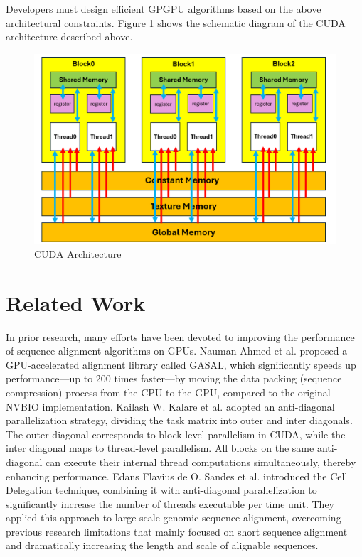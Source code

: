 \documentclass[PhD]{PHlab-thesis}
\begin{document}
Developers must design efficient GPGPU algorithms based on the above architectural constraints. Figure \ref{fig:CUDA Architecture} shows the schematic diagram of the CUDA architecture described above.
\begin{figure}[ht]
    \centering
    \includegraphics[width = 1\textwidth]{figures/CUDA_Architecture.png}
    \caption{CUDA Architecture}
    \label{fig:CUDA Architecture}
\end{figure}

\chapter{Related Work}
In prior research, many efforts have been devoted to improving the performance of sequence alignment algorithms on GPUs. Nauman Ahmed et al. \cite{CUDA3} proposed a GPU-accelerated alignment library called GASAL, which significantly speeds up performance—up to 200 times faster—by moving the data packing (sequence compression) process from the CPU to the GPU, compared to the original NVBIO implementation. Kailash W. Kalare et al. \cite{CUDA6} adopted an anti-diagonal parallelization strategy, dividing the task matrix into outer and inter diagonals. The outer diagonal corresponds to block-level parallelism in CUDA, while the inter diagonal maps to thread-level parallelism. All blocks on the same anti-diagonal can execute their internal thread computations simultaneously, thereby enhancing performance. Edans Flavius de O. Sandes et al. \cite{CUDAlign} introduced the Cell Delegation technique, combining it with anti-diagonal parallelization to significantly increase the number of threads executable per time unit. They applied this approach to large-scale genomic sequence alignment, overcoming previous research limitations that mainly focused on short sequence alignment and dramatically increasing the length and scale of alignable sequences.
\end{document}
